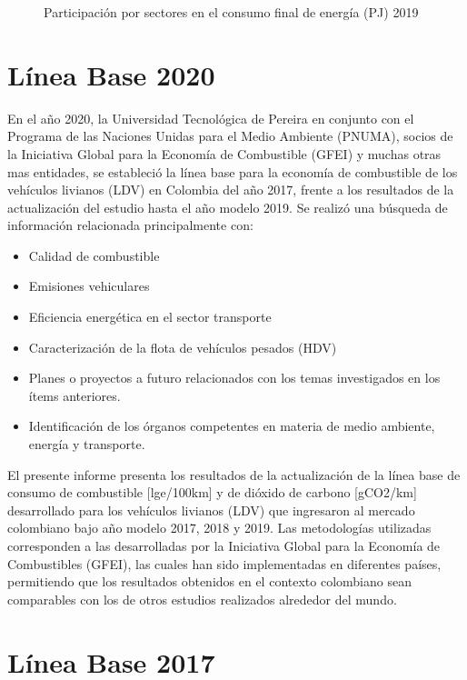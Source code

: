 \begin{figure}[htbp]
   \centering
   
    \caption{Participación por sectores en el consumo final de energía (PJ) 2019 \cite{Plan_Energetico-2050}}
    \label{fig:pn-participacion}
\end{figure}


\section{Línea Base 2020}

En el año 2020, la Universidad Tecnológica de Pereira en conjunto con el Programa de las Naciones Unidas para el Medio Ambiente (PNUMA), socios de la Iniciativa Global para la Economía de Combustible (GFEI) y muchas otras mas entidades, se estableció la línea base para la economía de combustible de los vehículos livianos (LDV) en Colombia del año 2017, frente a los resultados de la actualización del estudio hasta el año modelo 2019. Se realizó una búsqueda de información relacionada principalmente con:

\begin{itemize}
\item Calidad de combustible
\item Emisiones vehiculares
\item Eficiencia energética en el sector transporte
\item Caracterización de la flota de vehículos pesados (HDV)
\item Planes o proyectos a futuro relacionados con los temas investigados en los ítems
anteriores.
\item Identificación de los órganos competentes en materia de medio ambiente, energía y
transporte.
\end{itemize}

El presente informe presenta los resultados de la actualización de la línea base de consumo de combustible [lge/100km] y de dióxido de carbono [gCO2/km] desarrollado para los vehículos livianos (LDV) que ingresaron al mercado colombiano bajo año modelo 2017, 2018 y 2019. Las metodologías utilizadas corresponden a las desarrolladas por la Iniciativa Global para la Economía de Combustibles (GFEI), las cuales han sido implementadas en diferentes países, permitiendo que los resultados obtenidos en el contexto colombiano sean comparables con los de otros estudios realizados alrededor del mundo. \cite{Baseline_Pereira_2020}

\section{Línea Base 2017}

